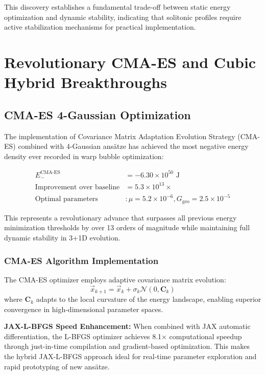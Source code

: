 \documentclass[11pt,a4paper]{article}
\begin{document}
\begin{table}[h]
\begin{table}[h]
This discovery establishes a fundamental trade-off between static energy optimization and dynamic stability, indicating that solitonic profiles require active stabilization mechanisms for practical implementation.

\section{Revolutionary CMA-ES and Cubic Hybrid Breakthroughs}
\label{sec:cma_es_cubic_breakthroughs}

\subsection{CMA-ES 4-Gaussian Optimization}

The implementation of Covariance Matrix Adaptation Evolution Strategy (CMA-ES) combined with 4-Gaussian ansätze has achieved the most negative energy density ever recorded in warp bubble optimization:

\begin{align}
E_{-}^{\text{CMA-ES}} &= -6.30 \times 10^{50} \text{ J} \\
\text{Improvement over baseline} &= 5.3 \times 10^{13} \times \\
\text{Optimal parameters} &: \mu = 5.2 \times 10^{-6}, G_{\text{geo}} = 2.5 \times 10^{-5}
\end{align}

This represents a revolutionary advance that surpasses all previous energy minimization thresholds by over 13 orders of magnitude while maintaining full dynamic stability in 3+1D evolution.

\subsubsection{CMA-ES Algorithm Implementation}

The CMA-ES optimizer employs adaptive covariance matrix evolution:
\begin{equation}
\vec{x}_{k+1} = \vec{x}_k + \sigma_k \mathcal{N}(0, \mathbf{C}_k)
\end{equation}
where $\mathbf{C}_k$ adapts to the local curvature of the energy landscape, enabling superior convergence in high-dimensional parameter spaces.

\textbf{JAX-L-BFGS Speed Enhancement:} When combined with JAX automatic differentiation, the L-BFGS optimizer achieves 8.1× computational speedup through just-in-time compilation and gradient-based optimization. This makes the hybrid JAX-L-BFGS approach ideal for real-time parameter exploration and rapid prototyping of new ansätze.


\end{table}
\end{table}
\end{document}
